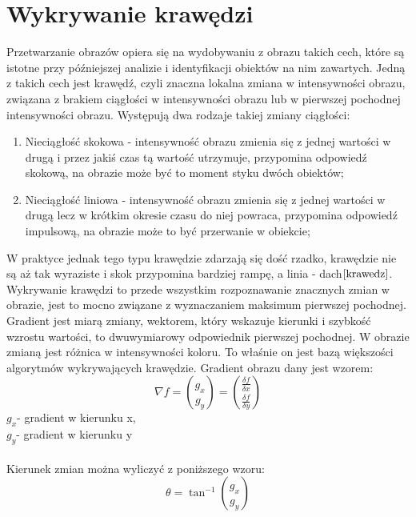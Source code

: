 \documentclass[eng,oneside]{mgr}
\begin{document}
\section{Wykrywanie krawędzi}
\hspace{1cm} Przetwarzanie obrazów opiera się na wydobywaniu z obrazu takich cech, które są istotne przy późniejszej analizie i identyfikacji obiektów na nim zawartych. Jedną z takich cech jest krawędź, czyli znaczna lokalna zmiana w intensywności obrazu, związana z brakiem ciągłości w intensywności obrazu lub w pierwszej pochodnej intensywności obrazu. Występują dwa rodzaje takiej zmiany ciągłości:
\begin{enumerate}
\item Nieciągłość skokowa - intensywność obrazu zmienia się z jednej wartości w drugą i przez jakiś czas tą wartość utrzymuje, przypomina odpowiedź skokową, na obrazie może być to moment styku dwóch obiektów;
\item Nieciągłość liniowa - intensywność obrazu zmienia się z jednej wartości w drugą lecz w krótkim okresie czasu do niej powraca, przypomina odpowiedź impulsową, na obrazie może to być przerwanie w obiekcie; 
\end{enumerate}
\hspace{1cm} W praktyce jednak tego typu krawędzie zdarzają się dość rzadko, krawędzie nie są aż tak wyraziste i skok przypomina bardziej rampę, a linia - dach$\cite{krawedz}$.
Wykrywanie krawędzi to przede wszystkim rozpoznawanie znacznych zmian w obrazie, jest to mocno związane z wyznaczaniem maksimum pierwszej pochodnej. 
\hspace{1cm} Gradient jest miarą zmiany, wektorem, który wskazuje kierunki i szybkość wzrostu wartości, to dwuwymiarowy odpowiednik pierwszej pochodnej. W obrazie zmianą jest różnica w intensywności koloru. To właśnie on jest bazą większości algorytmów wykrywających krawędzie. Gradient obrazu dany jest wzorem:
\begin{equation}
\nabla f = \binom{g_x}{g_y} = \binom{\frac{\delta f}{\delta x}}{\frac{\delta f}{\delta y}}
\end{equation} 
$g_x $- gradient w kierunku x,
\\
$g_y $- gradient w kierunku y
 \\
 \\
\hspace{1cm} Kierunek zmian można wyliczyć z poniższego wzoru:
\begin{equation}
\theta = \tan^{-1} \binom{g_x}{g_y}
\end{equation}
\end{document}
